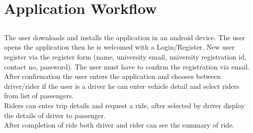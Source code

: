 \chapter{Application Workflow} \label{ap:Appendix1}

\section*{}
The user downloads and installs the application in an android device. The user opens the application then he is welcomed with a Login/Register. New user register via the register form (name, university email, university registration id, contact no, password). The user must have to confirm the registration via email.\\

After confirmation the user enters the application and chooses between driver/rider if the user is a driver he can enter vehicle detail and select riders from list of passengers.\\

Riders can enter trip details and request a ride, after selected by driver display the details of driver to passenger.\\

After completion of ride both driver and rider can see the summary of ride.

